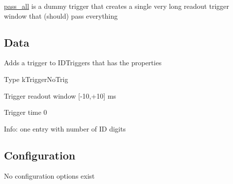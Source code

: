 \hyperlink{classpass__all}{pass\-\_\-all} is a dummy trigger that creates a single very long readout trigger window that (should) pass everything

\subsection*{Data}

Adds a trigger to {\ttfamily I\-D\-Triggers} that has the properties
\begin{DoxyItemize}
\item Type {\ttfamily k\-Trigger\-No\-Trig}
\item Trigger readout window \mbox{[}-\/10,+10\mbox{]} ms
\item Trigger time 0
\item Info\-: one entry with number of I\-D digits
\end{DoxyItemize}

\subsection*{Configuration}

No configuration options exist 